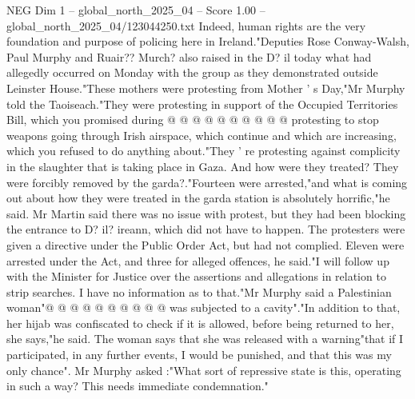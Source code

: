 \begin{textsample}{NEG Dim 1 – global\_north\_2025\_04 – Score 1.00 – global\_north\_2025\_04/123044250.txt}
Indeed, human rights are the very foundation and purpose of policing here in Ireland."Deputies Rose Conway-Walsh, Paul Murphy and Ruair??
Murch? also raised in the D? il today what had allegedly occurred on Monday with the group as they demonstrated outside Leinster House."These mothers were protesting from Mother ' s Day,"Mr Murphy told the Taoiseach."They were protesting in support of the Occupied Territories Bill, which you promised during @ @ @ @ @ @ @ @ @ @ protesting to stop weapons going through Irish airspace, which continue and which are increasing, which you refused to do anything about."They ' re protesting against complicity in the slaughter that is taking place in Gaza.
And how were they treated?
They were forcibly removed by the garda?."Fourteen were arrested,"and what is coming out about how they were treated in the garda station is absolutely horrific,"he said.
Mr Martin said there was no issue with protest, but they had been blocking the entrance to D? il? ireann, which did not have to happen.
The protesters were given a directive under the Public Order Act, but had not complied.
Eleven were arrested under the Act, and three for alleged offences, he said."I will follow up with the Minister for Justice over the assertions and allegations in relation to strip searches.
I have no information as to that."Mr Murphy said a Palestinian woman"@ @ @ @ @ @ @ @ @ @ was subjected to a cavity"."In addition to that, her hijab was confiscated to check if it is allowed, before being returned to her, she says,"he said.
The woman says that she was released with a warning"that if I participated, in any further events, I would be punished, and that this was my only chance".
Mr Murphy asked :"What sort of repressive state is this, operating in such a way?
This needs immediate condemnation."

\end{textsample}
